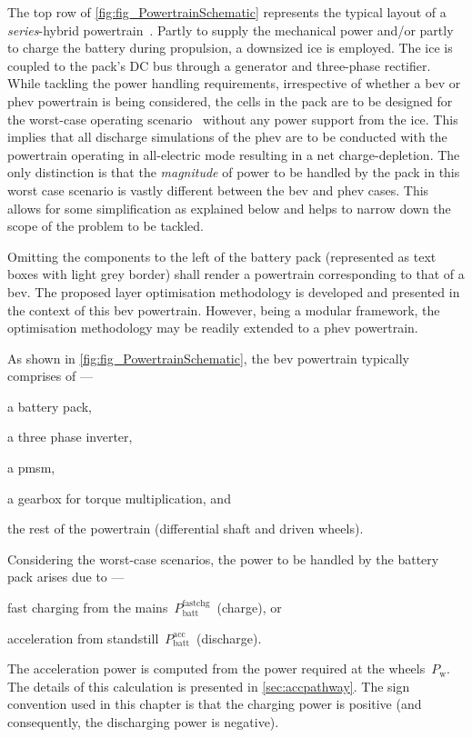 The top row of  \cref{fig:fig_PowertrainSchematic} represents the typical layout
of a \emph{series}-hybrid powertrain~\cite{Maksimovic2012}. Partly to supply the
mechanical  power and/or  partly  to  charge the  battery  during propulsion,  a
downsized \gls{ice} is  employed. The \gls{ice} is coupled to  the pack's DC bus
through  a  generator  and  three-phase  rectifier.  While  tackling  the  power
handling  requirements,  irrespective  of  whether  a  \gls{bev}  or  \gls{phev}
powertrain is  being considered, the  cells in the pack  are to be  designed for
the  worst-case operating  scenario \ie~without  any power  support from  the
\gls{ice}. This implies that all discharge  simulations of the \gls{phev} are to
be conducted with  the powertrain operating in all-electric mode  resulting in a
net charge-depletion. The only distinction is that the \emph{magnitude} of power
to  be handled  by the  pack in  this worst  case scenario  is vastly  different
between the \gls{bev} and \gls{phev}  cases. This allows for some simplification
as explained  below and  helps to  narrow down the  scope of  the problem  to be
tackled.

Omitting the  components to the  left of the  battery pack (represented  as text
boxes with light grey border) shall render a powertrain corresponding to that of
a  \gls{bev}.  The proposed  layer  optimisation  methodology is  developed  and
presented in the context of this  \gls{bev} powertrain. However, being a modular
framework, the optimisation methodology may  be readily extended to a \gls{phev}
powertrain.

As  shown   in  \cref{fig:fig_PowertrainSchematic},  the   \gls{bev}  powertrain
typically comprises of ---
\begin{enumerate*}[label=\itshape\alph*\upshape)]
    \item a battery pack,
    \item a three phase inverter,
    \item a \gls{pmsm},
    \item a gearbox for  torque multiplication, and
    \item the rest of the  powertrain  (differential shaft  and driven  wheels).
\end{enumerate*}
Considering the  worst-case scenarios, the  power to  be handled by  the battery
pack arises due to  ---
\begin{enumerate*}[label=\roman*)]
    \item fast charging from  the mains~$P^\text{fastchg}_\text{batt}$~(charge), or
    \item acceleration  from standstill~$P^\text{acc}_\text{batt}$~(discharge).
\end{enumerate*}
The   acceleration  power   is  computed   from  the   power  required   at  the
wheels~$P_\text{w}$.  The   details  of  this  calculation   is  presented  in
\cref{sec:accpathway}.  The  sign  convention  used  in  this  chapter  is  that
the  charging power  is positive  (and  consequently, the  discharging power  is
negative).


